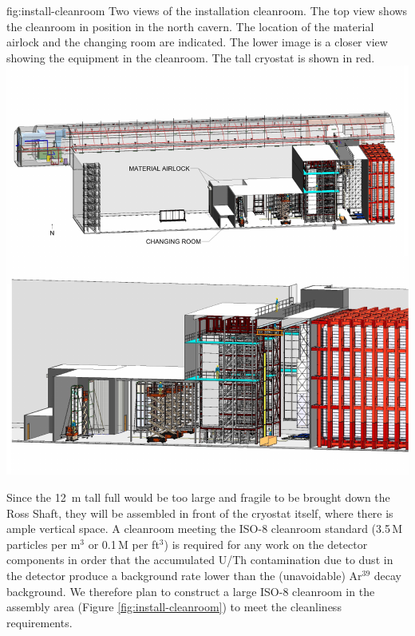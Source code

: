 \begin{dunefigure}{fig:install-cleanroom}
  {Two views of the installation cleanroom.  The top view shows the cleanroom in position in the north cavern. The location of the material airlock and the changing room are indicated. The lower image is a closer view showing the equipment in the cleanroom. The \cryostatht tall cryostat is shown in red.
  } 
\includegraphics[width=1.0\textwidth]{graphics/install-cleanroom.pdf}
\end{dunefigure}


Since the \SI{12}{m} tall full  would be too large and fragile to be brought down the Ross Shaft, they will be assembled in front of the cryostat itself, where there is ample vertical space. A cleanroom meeting the ISO-8 cleanroom standard (3.5$\,$M particles per m$^3$ or 0.1$\,$M per ft$^3$) is required for any work on the detector components in order that the accumulated U/Th contamination due to dust in the detector  produce a background rate lower than the (unavoidable) Ar$^{39}$ decay background. 
We therefore plan to construct a large ISO-8 cleanroom in the assembly area (Figure \ref{fig:install-cleanroom}) to meet the  cleanliness requirements.


